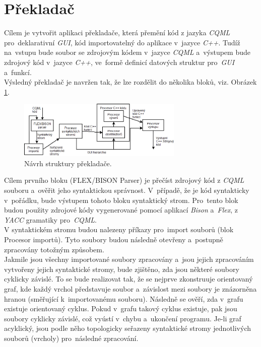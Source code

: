 \documentclass[11pt,twoside,a4paper]{book}
\begin{document}
\section{Překladač}
Cílem je vytvořit aplikaci překladače, která přemění kód z jazyka \textit{CQML} pro~deklarativní \textit{GUI}, kód importovatelný do aplikace v~jazyce \textit{C++}. Tudíž na~vstupu bude soubor se zdrojovým kódem v~jazyce \textit{CQML} a~výstupem bude zdrojový kód v~jazyce \textit{C++}, ve~formě definicí datových struktur pro~\textit{GUI} a~funkcí. \\
Výsledný překladač je navržen tak, že lze rozdělit do několika bloků, viz. Obrázek \ref{fig:fig1}.\\
\begin{figure}[!ht]
\begin{center}
  \includegraphics[width=0.7\textwidth]{parserdiag}
\caption{{\label{fig:fig1}}Návrh struktury překladače.}
\end{center}
\end{figure}
Cílem prvního bloku (FLEX/BISON Parser) je přečíst zdrojový kód z \textit{CQML} souboru a~ověřit jeho syntaktickou správnost. V~případě, že je kód syntakticky v~pořádku, bude výstupem tohoto bloku syntaktický strom. Pro~tento blok budou použity zdrojové kódy vygenerované pomocí aplikací \textit{Bison} a~\textit{Flex}, z \textit{YACC} gramatiky pro~\textit{CQML}.\\
V syntaktickém stromu budou nalezeny příkazy pro~import souborů (blok Procesor importů). Tyto soubory budou následně otevřeny a~postupně zpracovány totožným způsobem.\\
Jakmile jsou všechny importované soubory zpracovány a~jsou jejich zpracováním vytvořeny jejich syntaktické stromy, bude zjištěno, zda jsou některé soubory cyklicky závislé. To se bude realizovat tak, že se nejprve zkonstruuje orientovaný graf, kde každý vrchol představuje soubor a~závislost mezi soubory je znázorněna hranou (směřující k~importovanému souboru). Následně se ověří, zda v~grafu existuje orientovaný cyklus. Pokud v~grafu takový cyklus existuje, pak jsou soubory cyklicky závislé, což vyústí v~chybu a~ukončení programu. Je-li graf acyklický, jsou podle něho topologicky seřazeny syntaktické stromy jednotlivých souborů (vrcholy) pro~následné zpracování.\\ %
\end{document}
